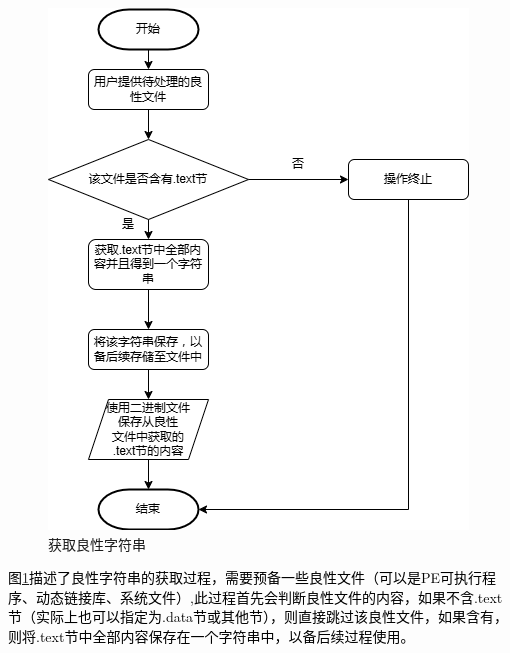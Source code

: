 \begin{figure}
  \centering
  \includegraphics[]{images/get_benign_strings.png}
  \caption{获取良性字符串}\label{fig:get_benign_strings}
\end{figure}
\textcolor{black}{图\ref{fig:get_benign_strings}描述了良性字符串的获取过程，需要预备一些良性文件（可以是PE可执行程序、动态链接库、系统文件）,此过程首先会判断良性文件的内容，如果不含.text节（实际上也可以指定为.data节或其他节），则直接跳过该良性文件，如果含有，则将.text节中全部内容保存在一个字符串中，以备后续过程使用。}

